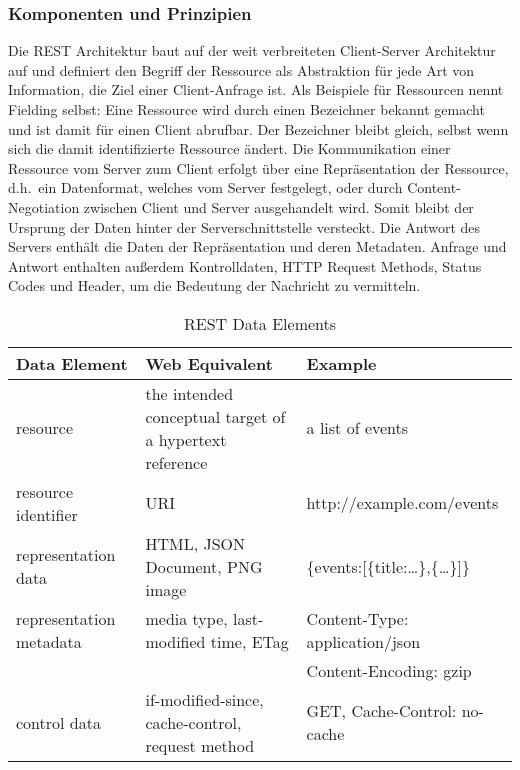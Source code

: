 \subsubsection{Komponenten und Prinzipien}
Die REST Architektur baut auf der weit verbreiteten Client-Server Architektur auf und definiert den Begriff der Ressource als Abstraktion für jede Art von Information, die Ziel einer Client-Anfrage ist.\cite[vgl.][88f.]{REST}
Als Beispiele für Ressourcen nennt Fielding selbst: 
Eine Ressource wird durch einen Bezeichner bekannt gemacht und ist damit für einen Client abrufbar.
Der Bezeichner bleibt gleich, selbst wenn sich die damit identifizierte Ressource ändert.
Die Kommunikation einer Ressource vom Server zum Client erfolgt über eine Repräsentation der Ressource, d.h.\ ein Datenformat, welches vom Server festgelegt, oder durch Content-Negotiation zwischen Client und Server ausgehandelt wird.
Somit bleibt der Ursprung der Daten hinter der Serverschnittstelle versteckt.
Die Antwort des Servers enthält die Daten der Repräsentation und deren Metadaten.
Anfrage und Antwort enthalten außerdem Kontrolldaten, \zB{} HTTP Request Methods, Status Codes und Header, um die Bedeutung der Nachricht zu vermitteln.\cite[vgl.][90f.]{REST}
\begin{table}[h!]
  \begin{center}
    \caption{REST Data Elements}\label{tab:REST Data Elemens}
    \begin{tabularx}{\textwidth}{XXX}
      \toprule
      \textbf{Data Element} & \textbf{Web Equivalent} & \textbf{Example}\\
      \midrule
      resource & the intended conceptual target of a hypertext reference & a list of events\\
      resource identifier & URI & http://example.com/events\\
      representation data & HTML, JSON Document, PNG image & \{events:[\{title:\dots\},\{\dots\}]\}\\
      representation metadata & media type, last-modified time, ETag & Content-Type: application/json\\
      & & Content-Encoding: gzip\\
      control data & if-modified-since, cache-control, request method & GET, Cache-Control: no-cache\\
    \end{tabularx}
  \end{center}
\end{table}
